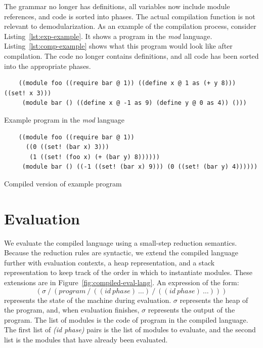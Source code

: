 The grammar no longer has definitions, all variables now include module references, and code is sorted into phases.
The actual compilation function is not relevant to demodularization.
As an example of the compilation process, consider Listing~\ref{lst:exp-example}.
It shows a program in the \emph{mod} language.
Listing~\ref{lst:comp-example} shows what this program would look like after compilation.
The code no longer contains definitions, and all code has been sorted into the appropriate phases.
\begin{listing}
  \begin{verbatim}
    ((module foo ((require bar @ 1)) ((define x @ 1 as (+ y 8))) ((set! x 3)))
     (module bar () ((define x @ -1 as 9) (define y @ 0 as 4)) ()))
  \end{verbatim}
  \caption{Example program in the \emph{mod} language}
  \label{lst:exp-example}
\end{listing}

\begin{listing}
  \begin{verbatim}
    ((module foo ((require bar @ 1)) 
      ((0 ((set! (bar x) 3))) 
       (1 ((set! (foo x) (+ (bar y) 8))))))
     (module bar () ((-1 ((set! (bar x) 9))) (0 ((set! (bar y) 4))))))
  \end{verbatim}
  \caption{Compiled version of example program}
  \label{lst:comp-example}
\end{listing}

\section{Evaluation}

We evaluate the compiled language using a small-step reduction semantics. 
Because the reduction rules are syntactic, we extend the compiled language further with evaluation contexts, a heap representation, and a stack representation to keep track of the order in which to instantiate modules.
These extensions are in Figure~\ref{fig:compiled-eval-lang}.
An expression of the form:
\[
  (\sigma\ /\ (program\ /\ ((id\ phase)\ \ldots)\ /\ ((id\ phase)\ \ldots)))
\]
represents the state of the machine during evaluation.
$\sigma$ represents the heap of the program, and, when evaluation finishes, $\sigma$ represents the output of the program.
The list of modules is the code of program in the compiled language.
The first list of \emph{(id phase)} pairs is the list of modules to evaluate, and the second list is the modules that have already been evaluated.

